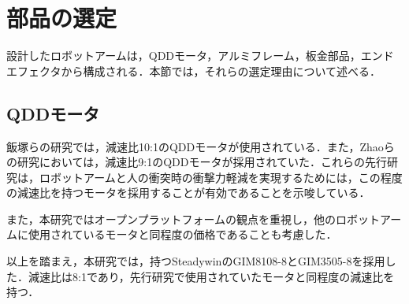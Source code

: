 \section{部品の選定}
設計したロボットアームは，QDDモータ，アルミフレーム，板金部品，エンドエフェクタから構成される．本節では，それらの選定理由について述べる．
\subsection{QDDモータ}
飯塚ら\cite{飯塚浩太2021}の研究では，減速比10:1のQDDモータが使用されている．また，Zhaoら\cite{10106520}の研究においては，減速比9:1のQDDモータが採用されていた．これらの先行研究は，ロボットアームと人の衝突時の衝撃力軽減を実現するためには，この程度の減速比を持つモータを採用することが有効であることを示唆している．

また，本研究ではオープンプラットフォームの観点を重視し，他のロボットアームに使用されているモータと同程度の価格であることも考慮した．

以上を踏まえ，本研究では，持つSteadywinのGIM8108-8とGIM3505-8を採用した．減速比は8:1であり，先行研究で使用されていたモータと同程度の減速比を持つ．
